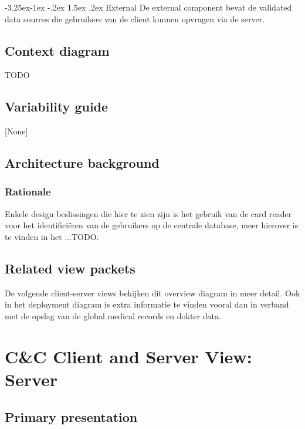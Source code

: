 \documentclass[a4paper,10pt]{book}
\makeatletter
\renewcommand\paragraph{\@startsection{paragraph}{4}{\z@}%
  {-3.25ex\@plus -1ex \@minus -.2ex}%
  {1.5ex \@plus .2ex}%
  {\normalfont\normalsize\bfseries}}
\makeatother
\begin{document}
\paragraph{External}
De external component bevat de validated data sources die gebruikers van de client kunnen opvragen via de server.



\subsection{Context diagram}
TODO

\subsection{Variability guide}
[None]

\subsection{Architecture background}

\subsubsection{Rationale}
Enkele design beslissingen die hier te zien zijn is het gebruik van de card reader voor het identifici\"{e}ren van de gebruikers op de centrale database, meer hierover is te vinden in het ...TODO.

\subsection{Related view packets}
De volgende client-server views bekijken dit overview diagram in meer detail.  Ook in het deployment diagram is extra informatie te vinden vooral dan in verband met de opslag van de global medical records en dokter data.



\section{C\&C Client and Server View: Server}
\label{Client and Server View: Server}
\subsection{Primary presentation}
\end{document}
